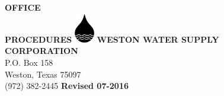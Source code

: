 \documentclass{article}
\begin{document}
\begin{titlepage}
\begin{center}
\uppercase{\fontsize{1.5cm}{2.5cm}\selectfont\textbf{Office\\Procedures}}
\vfill
\includegraphics[height=1.3cm]{logo}
\uppercase{\huge\textbf{Weston Water Supply\\Corporation}}
\\
{\huge P.O. Box 158\\Weston, Texas 75097\\(972) 382-2445}
\vfill
{\huge\textbf{Revised 07-2016}}
\end{center}
\end{titlepage}










\end{document}
